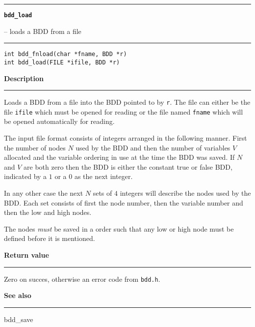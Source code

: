 \begin{minipage}{\textwidth}

\noindent\begin{minipage}{\textwidth}
\rule{\textwidth}{0.5mm}
{\tt\bf bdd\_load }
\--- loads a BDD from a file  \hspace{\fill}
\\\rule[1.5ex]{\textwidth}{0.5mm}
\end{minipage}

\noindent\begin{verbatim}
int bdd_fnload(char *fname, BDD *r)
int bdd_load(FILE *ifile, BDD *r) 
\end{verbatim}

\vspace{\parsep}\noindent
{\bf Description}\\\rule[1.5ex]{\textwidth}{0.2mm}\vspace{-1.5ex}\setlength{\parindent}{1em}
Loads a BDD from a file into the BDD pointed to by {\tt r}.
           The file can either be the file {\tt ifile} which must be opened
	   for reading or the file named {\tt fname} which will be opened
	   automatically for reading.

	   The input file format consists of integers arranged in the following
	   manner. First the number of nodes $N$ used by the BDD and then the
	   number of variables $V$ allocated and the variable ordering
	   in use at the time the BDD was saved.
	   If $N$ and $V$ are both zero then the BDD is either the constant
	   true or false BDD, indicated by a $1$ or a $0$ as the next integer.

	   In any other case the next $N$ sets of $4$ integers will describe
	   the nodes used by the BDD. Each set consists of first the node
	   number, then the variable number and then the low and high nodes.

	   The nodes {\it must} be saved in a order such that any low or
	   high node must be defined before it is mentioned. 

\setlength{\parindent}{0em}\vspace{\parsep}\vspace{\baselineskip}\noindent
{\bf Return value}\\\rule[1.5ex]{\textwidth}{0.2mm}\vspace{-1.5ex}
Zero on succes, otherwise an error code from {\tt bdd.h}. 

\vspace{\parsep}\vspace{\baselineskip}\noindent
{\bf See also}\\\rule[1.5ex]{\textwidth}{0.2mm}\vspace{-1.5ex}
bdd\_save 
\end{minipage}
